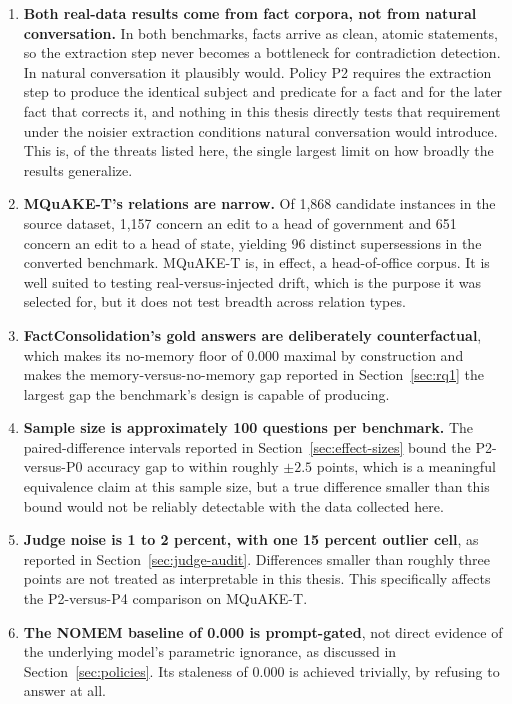 \begin{enumerate}
\item \textbf{Both real-data results come from fact corpora, not from natural conversation.} In both benchmarks, facts arrive as clean, atomic statements, so the extraction step never becomes a bottleneck for contradiction detection. In natural conversation it plausibly would. Policy P2 requires the extraction step to produce the identical subject and predicate for a fact and for the later fact that corrects it, and nothing in this thesis directly tests that requirement under the noisier extraction conditions natural conversation would introduce. This is, of the threats listed here, the single largest limit on how broadly the results generalize.
\item \textbf{MQuAKE-T's relations are narrow.} Of 1,868 candidate instances in the source dataset, 1,157 concern an edit to a head of government and 651 concern an edit to a head of state, yielding 96 distinct supersessions in the converted benchmark. MQuAKE-T is, in effect, a head-of-office corpus. It is well suited to testing real-versus-injected drift, which is the purpose it was selected for, but it does not test breadth across relation types.
\item \textbf{FactConsolidation's gold answers are deliberately counterfactual}, which makes its no-memory floor of 0.000 maximal by construction and makes the memory-versus-no-memory gap reported in Section~\ref{sec:rq1} the largest gap the benchmark's design is capable of producing.
\item \textbf{Sample size is approximately 100 questions per benchmark.} The paired-difference intervals reported in Section~\ref{sec:effect-sizes} bound the P2-versus-P0 accuracy gap to within roughly $\pm 2.5$ points, which is a meaningful equivalence claim at this sample size, but a true difference smaller than this bound would not be reliably detectable with the data collected here.
\item \textbf{Judge noise is 1 to 2 percent, with one 15 percent outlier cell}, as reported in Section~\ref{sec:judge-audit}. Differences smaller than roughly three points are not treated as interpretable in this thesis. This specifically affects the P2-versus-P4 comparison on MQuAKE-T.
\item \textbf{The NOMEM baseline of 0.000 is prompt-gated}, not direct evidence of the underlying model's parametric ignorance, as discussed in Section~\ref{sec:policies}. Its staleness of 0.000 is achieved trivially, by refusing to answer at all.

\end{enumerate}
